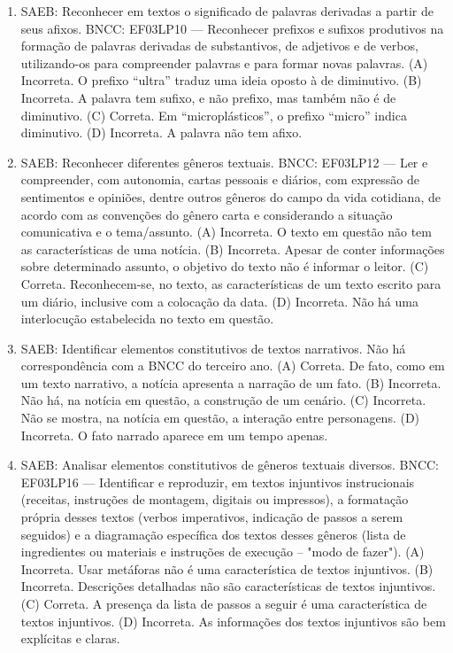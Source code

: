 \begin{enumerate}
\item
SAEB: Reconhecer em textos o significado de palavras derivadas a partir de seus afixos. 
BNCC: EF03LP10 --- Reconhecer prefixos e sufixos produtivos na formação de palavras derivadas de substantivos, de adjetivos e de verbos, utilizando-os para compreender palavras e para formar novas palavras. 
(A) Incorreta. O prefixo ``ultra'' traduz uma ideia oposto à de diminutivo. 
(B) Incorreta. A palavra tem sufixo, e não prefixo, mas também não é de diminutivo. 
(C) Correta. Em ``microplásticos'', o prefixo ``micro'' indica diminutivo.
(D) Incorreta. A palavra não tem afixo.

\item
SAEB: Reconhecer diferentes gêneros textuais. 
BNCC: EF03LP12 --- Ler e compreender, com autonomia, cartas pessoais e diários, com expressão de sentimentos e opiniões, dentre outros gêneros do campo da vida cotidiana, de acordo com as convenções do gênero carta e considerando a situação comunicativa e o tema/assunto. 
(A) Incorreta. O texto em questão não tem as características de uma notícia. 
(B) Incorreta. Apesar de conter informações sobre determinado assunto, o objetivo do texto não é informar o leitor. 
(C) Correta. Reconhecem-se, no texto, as características de um texto escrito para um diário, inclusive com a colocação da data. 
(D) Incorreta. Não há uma interlocução estabelecida no texto em questão.

\item
SAEB: Identificar elementos constitutivos de textos narrativos. Não há correspondência com a BNCC do terceiro ano. 
(A) Correta. De fato, como em um texto narrativo, a notícia apresenta a narração de um fato.
(B) Incorreta. Não há, na notícia em questão, a construção de um cenário. 
(C) Incorreta. Não se mostra, na notícia em questão, a interação entre personagens. 
(D) Incorreta. O fato narrado aparece em um tempo apenas.

\item
SAEB: Analisar elementos constitutivos de gêneros textuais diversos. 
BNCC: EF03LP16 --- Identificar e reproduzir, em textos injuntivos instrucionais (receitas, instruções de montagem, digitais ou impressos), a formatação própria desses textos (verbos imperativos, indicação de passos a serem seguidos) e a diagramação específica dos textos desses gêneros (lista de ingredientes ou materiais e instruções de execução -- "modo de fazer"). 
(A) Incorreta. Usar metáforas não é uma característica de textos injuntivos. 
(B) Incorreta. Descrições detalhadas não são características de textos injuntivos. 
(C) Correta. A presença da lista de passos a seguir é uma característica de textos injuntivos. 
(D) Incorreta. As informações dos textos injuntivos são bem explícitas e claras. 


\end{enumerate}
